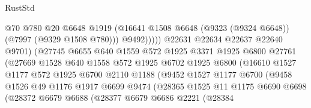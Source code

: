 \begin{lexlean}{RustStd}
\begin{coremodule}
{\begin{coremodule}
{{{{{{{{{{{{{{{{{{{{{{{{{{{{{{{{{{{{{{{{{{{                                    @70
                                    @780
                                    @20
                                    @6648
                                    @1919
                                    (@16641
                                      @1508
                                      @6648
                                      (@9323 (@9324 @6648))
                                      (@7997 (@9329 @1508 @780)))
                                    @9492)))))
                          @22631
                          @22634
                          @22637
                          @22640
                          @9701)
                        (@27745
                          @6655
                          @640
                          @1559
                          @572
                          @1925
                          @3371
                          @1925
                          @6800
                          @27761
                          (@27669
                            @1528
                            @640
                            @1558
                            @572
                            @1925
                            @6702
                            @1925
                            @6800
                            (@16610
                              @1527
                              @1177
                              @572
                              @1925
                              @6700
                              @2110
                              @1188
                              (@9452
                                @1527
                                @1177
                                @6700
                                (@9458
                                  @1526
                                  @49
                                  @1176
                                  @1917
                                  @6699
                                  @9474
                                  (@28365
                                    @1525
                                    @11
                                    @1175
                                    @6690
                                    @6698
                                    (@28372
                                      @6679
                                      @6688
                                      (@28377
                                        @6679
                                        @6686
                                        @2221
                                        (@28384
}}}}}}}}}}}}}}}}}}}}}}}}}}}}}}}}}}}}}}}}}}}
\end{coremodule}}
\end{coremodule}
\end{lexlean}
